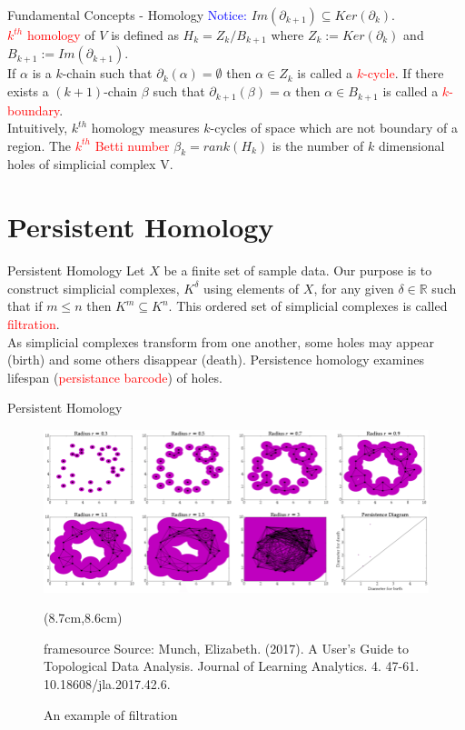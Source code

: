 \documentclass{beamer}
\newcommand{\source}[1]{\begin{textblock*}{4cm}(8.7cm,8.6cm)
    \begin{beamercolorbox}[ht=0.5cm,right]{framesource}
        \usebeamerfont{framesource}\usebeamercolor[fg]{framesource} Source: {#1}
    \end{beamercolorbox}
\end{textblock*}}
\begin{document}
\begin{frame}{Fundamental Concepts - Homology}
    \textcolor{blue}{Notice:} $Im(\partial_{k+1})\subseteq Ker(\partial_{k})$. \\
    \vspace{0.5cm}
    \textcolor{red}{$k^{th}$ homology} of $V$ is defined as $H_k = Z_k/B_{k+1}$ where $Z_k:=Ker(\partial_k)$ and $B_{k+1}:=Im(\partial_{k+1})$. \\
    \vspace{0.5cm}
    If $\alpha$ is a $k$-chain such that $\partial_k(\alpha) = \emptyset$ then $\alpha \in Z_k$ is called a \textcolor{red}{$k$-cycle}. If there exists a $(k+1)$-chain $\beta$ such that $\partial_{k+1}(\beta)=\alpha$ then $\alpha \in B_{k+1}$ is called a \textcolor{red}{$k$-boundary}. \\
    \vspace{0.5cm}
    Intuitively, $k^{th}$ homology measures $k$-cycles of space which are not boundary of a region. The \textcolor{red}{$k^{th}$ Betti number} $\beta_k=rank(H_k)$ is the number of $k$ dimensional holes of simplicial complex V.
\end{frame}

\section{Persistent Homology}
\begin{frame}{Persistent Homology}
    Let $X$ be a finite set of sample data. Our purpose is to construct simplicial complexes, $K^{\delta}$ using elements of $X$, for any given $\delta \in \mathbb{R}$ such that if $m \leq n$ then $K^m \subseteq K^n$. This ordered set of simplicial complexes is called \textcolor{red}{filtration}.\\
    \vspace{0.5cm}
    As simplicial complexes transform from one another, some holes may appear (birth) and some others disappear (death). Persistence homology examines lifespan (\textcolor{red}{persistance barcode}) of holes. 
\end{frame}

\begin{frame}{Persistent Homology}
    \begin{figure}
        \includegraphics[scale=0.4]{./example.png}
        \source{Munch, Elizabeth. (2017). A User’s Guide to Topological Data Analysis. Journal of Learning Analytics. 4. 47-61. 10.18608/jla.2017.42.6. }
        \caption{An example of filtration}
    \end{figure}
\end{frame}
\end{document}
